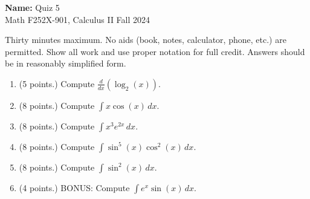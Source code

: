 \documentclass[12pt]{article}
\newcommand{\ds}{\displaystyle}
\newcommand{\points}[1]{(#1 points.)}		%
\begin{document}
\pagestyle{plain}

\noindent \textbf{Name:} \underline{\hspace{15em}}		\hfill	Quiz 5 \\
           Math F252X-901, Calculus II  			\hfill	Fall 2024 	

                \vspace{1cm}
                
Thirty minutes maximum. No aids (book, notes,
calculator, phone, etc.) are permitted. Show all work and use proper
notation for full credit. Answers should be in reasonably simplified
form.

\begin{enumerate}

  \item \points{5} Compute $\ds \frac{d}{dx}(\log_{2}(x))$.
    \vspace{3cm}

  \item \points{8} Compute $\ds \int x\cos(x) \, dx$.
    \vspace{4cm}

  \item \points{8} Compute $\ds \int x^3 e^{2x} \, dx$.
    \vfill

    \newpage

  \item \points{8} Compute $\int \sin^5(x) \cos^2(x) \, dx$.
    \vfill

  \item \points{8} Compute $\int \sin^2(x) \, dx$.
    \vfill

  \item \points{4} BONUS: Compute $\int e^x \sin(x) \, dx$.
    \vfill

  
\end{enumerate}
\end{document}
